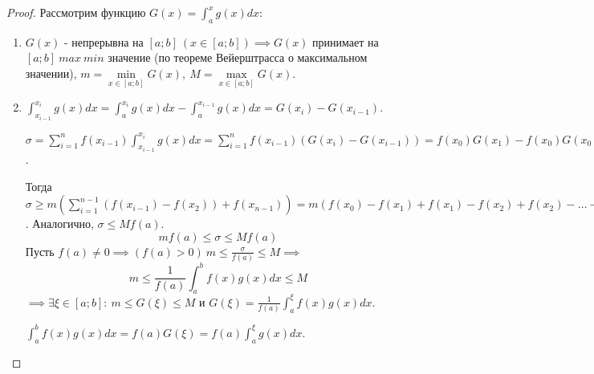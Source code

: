 \documentclass{report}
\theoremstyle{definition}
\begin{document}
\begin{proof}
  Рассмотрим функцию $G(x) = \int_{a}^{x}g(x)dx$:
  \begin{enumerate}
    \item $G(x)$ - непрерывна на $[a;b] \ (x\in[a;b]) \implies G(x)$ принимает на $[a;b]
            \ max \ min$ значение (по теореме Вейерштрасса о максимальном значении), $m = \underset
            {x\in[a;b]}{\min}G(x), \ M = \underset{x\in[a;b]}{\max} G(x)$.
    \item $\int_{x_{i-1}}^{x_{i}}g(x)dx = \int_{a}^{x_{i}}g(x)dx - \int_{a}^{x_{i-1}}g(x)dx =
            G(x_{i}) - G(x_{i-1})$.

          $\sigma = \sum_{i=1}^{n}f(x_{i-1})\int_{x_{i-1}}^{x_{i}}g(x)dx = \sum_{i=1}^{n}f(x_{i-1})
            (G(x_{i}) - G(x_{i-1})) = f(x_{0}) G(x_{1}) - f(x_{0})G(x_{0}) +
            f(x_{1}) G(x_{2}) - f(x_{1}) G(x_{1}) + \ldots + f(x_{n-2})G(x_{n-1}) -
            f(x_{n-2}) G(x_{n-2}) + f(x_{n-1})G(x_{n}) - f(x_{n-1})G(x_{n-1}) =
            \sum_{i=1}^{n-1} G(x_{i})(f(x_{i-1}) - f(x_{i})) + f(x_{n-1})G(x_{n})$.

          Тогда $\sigma \geqslant m (\sum_{i=1}^{n-1}(f(x_{i-1}) - f(x_{2})) + f(x_{n-1})) =
            m(f(x_{0}) - f(x_{1}) + f(x_{1}) - f(x_{2}) + f(x_{2}) - \ldots - f(x_{n-1}) + f(x_{n-1}))
            = mf(a)$. Аналогично, $\sigma \leqslant Mf(a)$.
          \begin{equation*}
            mf(a) \leqslant \sigma \leqslant Mf(a)
          \end{equation*}
          Пусть $f(a) \ne 0 \implies (f(a) > 0) \ m \leqslant \frac{\sigma}{f(a)} \leqslant M \implies$
          \begin{equation*}
            m \leqslant \frac{1}{f(a)}\int_{a}^{b}f(x)g(x)dx \leqslant M
          \end{equation*}
          $\implies \exists \xi \in [a;b]: \ m \leqslant G(\xi) \leqslant M$ и $G(\xi) = \frac{1}{f(a)}
            \int_{a}^{\xi}f(x)g(x)dx$.

          $\int_{a}^{b}f(x)g(x)dx = f(a)G(\xi) = f(a)\int_{a}^{\xi}g(x)dx$.
  \end{enumerate}
\end{proof}
\end{document}
